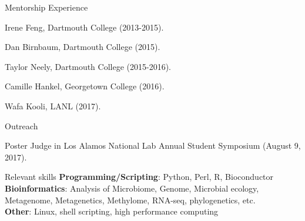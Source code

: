 \documentclass{resume} %
\begin{document}


\begin{rSection}{Mentorship Experience}
\item Irene Feng, Dartmouth College (2013-2015).
\item Dan Birnbaum, Dartmouth College (2015).
\item Taylor Neely, Dartmouth College (2015-2016).
\item Camille Hankel, Georgetown College (2016).
\item Wafa Kooli, LANL (2017).
\end{rSection}


\begin{rSection}{Outreach}
\item Poster Judge in Los Alamos National Lab Annual Student Symposium (August 9, 2017).
\end{rSection}




\begin{rSection}{Relevant skills}
{\bf Programming/Scripting}: Python, Perl, R, Bioconductor\\
{\bf Bioinformatics}: Analysis of Microbiome, Genome, Microbial ecology, Metagenome, Metagenetics, Methylome, RNA-seq, phylogenetics, etc.\\
{\bf Other}: Linux, shell scripting, high performance computing\\
\end{rSection}







\end{document}
